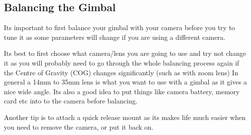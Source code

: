\documentclass[11pt,a4paper]{article}
\begin{document}
		\newpage
		\subsection{Balancing the Gimbal}
		Its important to first balance your gimbal with your camera before you try to tune it as some parameters will change if you are using a different camera.
		
		Its best to first choose what camera/lens you are going to use and try not change it as you will probably need to go through the whole balancing process again if the Centre of Gravity (COG) changes significantly (such as with zoom lens) In general a 14mm to 35mm lens is what you want to use with a gimbal as it gives a nice wide angle. Its also a good idea to put things like camera battery, memory card etc into to the camera before balancing.
		
		Another tip is to attach a quick release mount as its makes life much easier when you need to remove the camera, or put it back on.
\end{document}

